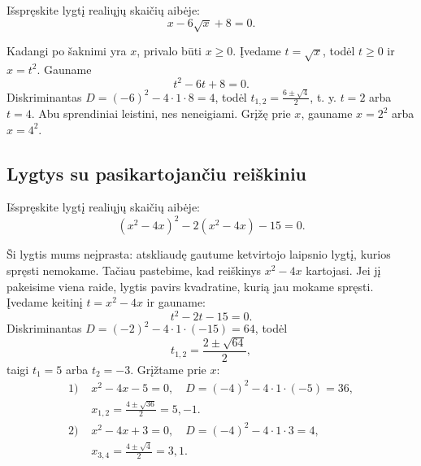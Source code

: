 \documentclass[11pt,a4paper]{scrartcl}
\begin{document}
\begin{example}
Išspręskite lygtį realiųjų skaičių aibėje:
\begin{equation*}
x-6\sqrt{x}+8=0.
\end{equation*}
\end{example}
\begin{solution}
Kadangi po šaknimi yra \(x\), privalo būti \(x\ge0\). Įvedame \(t=\sqrt{x}\), todėl \(t\ge0\) ir \(x=t^2\). Gauname
\begin{equation*}
t^2-6t+8=0.
\end{equation*}
Diskriminantas \(D=(-6)^2-4\cdot1\cdot8=4\), todėl \(t_{1,2}=\frac{6\pm\sqrt4}{2}\), t. y. \(t=2\) arba \(t=4\). Abu sprendiniai leistini, nes neneigiami. Grįžę prie \(x\), gauname \(x=2^2\) arba \(x=4^2\).
\end{solution}

\subsection{Lygtys su pasikartojančiu reiškiniu}

\begin{example}
Išspręskite lygtį realiųjų skaičių aibėje:
\begin{equation*}
(x^2-4x)^2-2(x^2-4x)-15=0.
\end{equation*}
\end{example}
\begin{solution}
Ši lygtis mums neįprasta: atskliaudę gautume ketvirtojo laipsnio lygtį, kurios spręsti nemokame. Tačiau pastebime, kad reiškinys \(x^2-4x\) kartojasi. Jei jį pakeisime viena raide, lygtis pavirs kvadratine, kurią jau mokame spręsti. Įvedame keitinį \(t=x^2-4x\) ir gauname:
\begin{equation*}
t^2-2t-15=0.
\end{equation*}
Diskriminantas \(D=(-2)^2-4\cdot1\cdot(-15)=64\), todėl
\begin{equation*}
t_{1,2}=\frac{2\pm\sqrt{64}}{2},
\end{equation*}
taigi \(t_1=5\) arba \(t_2=-3\). Grįžtame prie \(x\):
\begin{equation*}
\begin{aligned}
\text{1) } &x^2-4x-5=0,\quad D=(-4)^2-4\cdot1\cdot(-5)=36,\\
&x_{1,2}=\frac{4\pm\sqrt{36}}{2}=5,-1.\\
\text{2) } &x^2-4x+3=0,\quad D=(-4)^2-4\cdot1\cdot3=4,\\
&x_{3,4}=\frac{4\pm\sqrt4}{2}=3,1.
\end{aligned}
\end{equation*}
\end{solution}
\end{document}
